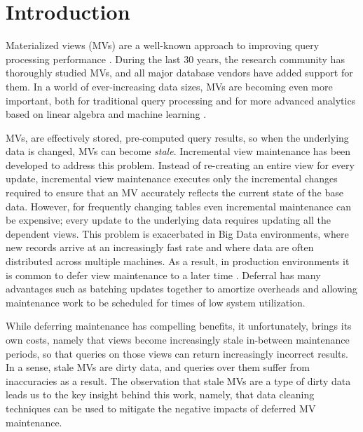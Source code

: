 \section{Introduction}
Materialized views (MVs) are a well-known approach to improving query processing performance \cite{LarsonY85, gupta1995maintenance, chirkova2011materialized, halevy2001answering}.
During the last 30 years, the research community has thoroughly studied MVs, and all major database vendors have added support for them.
In a world of ever-increasing data sizes, MVs are becoming even more important, both for traditional query processing
 \cite{lefevre2014opportunistic, bailis2014scalable, perez2014history} and for more advanced analytics based on linear algebra and machine learning \cite{nikolic2014linview, zhang2014mat}.

MVs, are effectively stored, pre-computed query results, so when the underlying data is changed, MVs can become \emph{stale}. 
Incremental view maintenance has been developed to address this problem\cite{gupta1995maintenance, chirkova2011materialized}.
Instead of re-creating an entire view for every update, incremental view maintenance executes only the incremental changes required to ensure that an MV accurately reflects the current state of the base data.   However, for frequently changing tables even incremental maintenance can be expensive; every update to the underlying data requires updating all the dependent views.  This problem is exacerbated in Big Data environments, where new records arrive at an increasingly fast rate and where data are often 
distributed across multiple machines.  As a result, in production environments it is
common to defer view maintenance to a later time \cite{chirkova2011materialized, DBLP:conf/sigmod/ColbyGLMT96}.
Deferral has many advantages such as batching updates together to amortize overheads and allowing maintenance work to be scheduled for times of low system utilization.   

While deferring maintenance has compelling benefits, it unfortunately, brings its own costs, namely that views become increasingly stale in-between maintenance periods, so that queries on those views can return increasingly incorrect results.  In a sense, stale MVs are dirty data, and queries over them suffer from inaccuracies as a result.   The observation that stale MVs are a type of dirty data leads us to the key insight behind this work, namely, that data cleaning techniques can be used to mitigate the negative impacts of deferred MV maintenance.  

